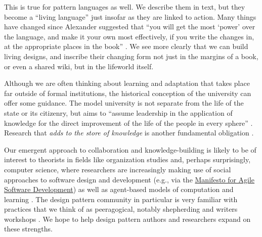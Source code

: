 This is true for pattern languages as well.  We describe them in text, but they become a ``living language'' \cite[p.~xvii]{alexander1977pattern}  just insofar as they are linked to action.  Many things have changed since Alexander suggested that ``you will get the most `power' over the language, and make it your own most effectively, if you write the changes in, at the appropriate places in the book'' \cite[p.~xl]{alexander1977pattern}.  We see more clearly that we can build living designs, and inscribe their changing form not just in the margins of a book, or even a shared wiki, but in the lifeworld itself.  

Although we are often thinking about learning and adaptation that takes
place far outside of formal institutions, the historical conception
of the university can offer some guidance.
%
The model university is not separate from the life of the state or its
citizenry, but aims to ``assume leadership in the application of
knowledge for the direct improvement of the life of the people in
every sphere'' \cite[p.~88]{curti1949university}. Research that \emph{adds
to the store of knowledge} is another fundamental
obligation \cite[p.~550]{curti1949university}.    


Our emergent approach to collaboration and knowledge-building is likely to be of interest to theorists in fields like organization studies and, perhaps surprisingly, computer science, where researchers are increasingly making use of social approaches to software design and development (e.g., via the \href{http://www.agilemanifesto.org/}{Manifesto for Agile Software Development}) as well as agent-based models of computation and learning \cite{minsky1967programming,poetry-workshop}.  
%
The design pattern community in particular is very familiar with practices that we think of as peeragogical, notably shepherding and writers workshops \cite{harrison1999language,coplien1997pattern}.  We hope to help design pattern authors and researchers expand on these strengths.

